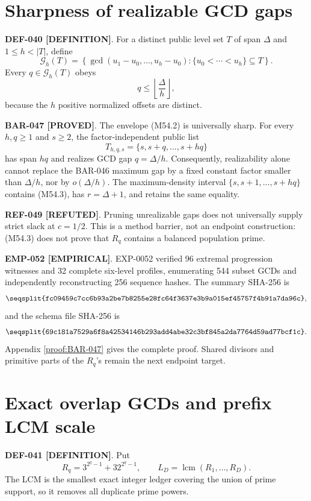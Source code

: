 \documentclass[11pt]{article}
\newcommand{\claimstatus}[2]{\textbf{#1 [#2]}}
\begin{document}
\section{Sharpness of realizable GCD gaps}

\claimstatus{DEF-040}{DEFINITION}. For a distinct public level set \(T\) of
span \(\Delta\) and \(1\le h<|T|\), define
\[
\mathcal G_h(T)=
\left\{\gcd(u_1-u_0,\ldots,u_h-u_0):
\{u_0<\cdots<u_h\}\subseteq T\right\}.
\tag{M54.1}
\]
Every \(q\in\mathcal G_h(T)\) obeys
\[
q\le\left\lfloor\frac{\Delta}{h}\right\rfloor,
\tag{M54.2}
\]
because the \(h\) positive normalized offsets are distinct.

\claimstatus{BAR-047}{PROVED}. The envelope (M54.2) is universally sharp.
For every \(h,q\ge1\) and \(s\ge2\), the factor-independent public list
\[
T_{h,q,s}=\{s,s+q,\ldots,s+hq\}
\tag{M54.3}
\]
has span \(hq\) and realizes GCD gap \(q=\Delta/h\). Consequently,
realizability alone cannot replace the BAR-046 maximum gap by a fixed
constant factor smaller than \(\Delta/h\), nor by \(o(\Delta/h)\).
The maximum-density interval \(\{s,s+1,\ldots,s+hq\}\) contains (M54.3),
has \(r=\Delta+1\), and retains the same equality.

\claimstatus{REF-049}{REFUTED}. Pruning unrealizable gaps does not
universally supply strict slack at \(c=1/2\). This is a method barrier, not
an endpoint construction: (M54.3) does not prove that \(R_q\) contains a
balanced population prime.

\claimstatus{EMP-052}{EMPIRICAL}. EXP-0052 verified 96 extremal progression
witnesses and 32 complete six-level profiles, enumerating 544 subset GCDs
and independently reconstructing 256 sequence hashes. The summary SHA-256 is
\[
\texttt{\seqsplit{fc09459c7cc6b93a2be7b8255e28fc64f3637e3b9a015ef45757f4b91a7da96c}},
\]
and the schema file SHA-256 is
\[
\texttt{\seqsplit{69c181a7529a6f8a42534146b293add4abe32c3bf845a2da7764d59ad77bcf1c}}.
\]
Appendix \ref{proof:BAR-047} gives the complete proof. Shared divisors and
primitive parts of the \(R_q\)'s remain the next endpoint target.

\section{Exact overlap GCDs and prefix LCM scale}

\claimstatus{DEF-041}{DEFINITION}. Put
\[
R_q=3^{2^q-1}+32^{2^q-1},
\qquad
L_D=\operatorname{lcm}(R_1,\ldots,R_D).
\tag{M55.1}
\]
The LCM is the smallest exact integer ledger covering the union of prime
support, so it removes all duplicate prime powers.
\end{document}

